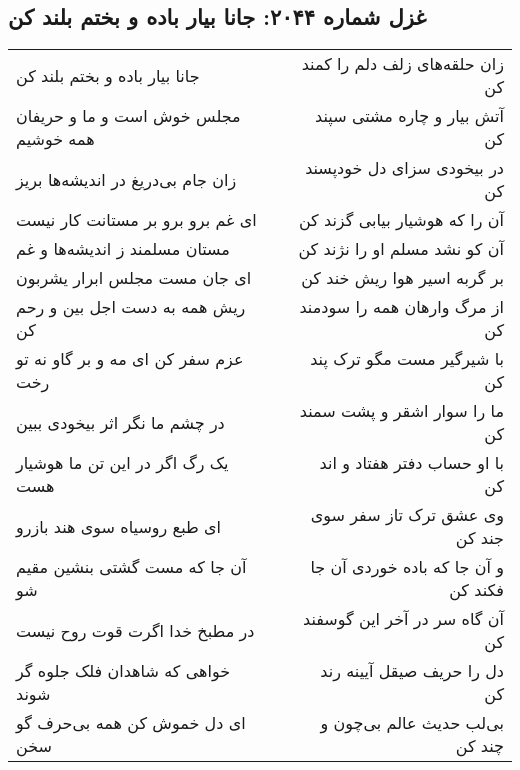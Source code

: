 \begin{center}
\section*{غزل شماره ۲۰۴۴: جانا بیار باده و بختم بلند کن}
\label{sec:2044}
\begin{longtable}{l p{0.5cm} r}
جانا بیار باده و بختم بلند کن
&&
زان حلقه‌های زلف دلم را کمند کن
\\
مجلس خوش است و ما و حریفان همه خوشیم
&&
آتش بیار و چاره مشتی سپند کن
\\
زان جام بی‌دریغ در اندیشه‌ها بریز
&&
در بیخودی سزای دل خودپسند کن
\\
ای غم برو برو بر مستانت کار نیست
&&
آن را که هوشیار بیابی گزند کن
\\
مستان مسلمند ز اندیشه‌ها و غم
&&
آن کو نشد مسلم او را نژند کن
\\
ای جان مست مجلس ابرار یشربون
&&
بر گربه اسیر هوا ریش خند کن
\\
ریش همه به دست اجل بین و رحم کن
&&
از مرگ وارهان همه را سودمند کن
\\
عزم سفر کن ای مه و بر گاو نه تو رخت
&&
با شیرگیر مست مگو ترک پند کن
\\
در چشم ما نگر اثر بیخودی ببین
&&
ما را سوار اشقر و پشت سمند کن
\\
یک رگ اگر در این تن ما هوشیار هست
&&
با او حساب دفتر هفتاد و اند کن
\\
ای طبع روسیاه سوی هند بازرو
&&
وی عشق ترک تاز سفر سوی جند کن
\\
آن جا که مست گشتی بنشین مقیم شو
&&
و آن جا که باده خوردی آن جا فکند کن
\\
در مطبخ خدا اگرت قوت روح نیست
&&
آن گاه سر در آخر این گوسفند کن
\\
خواهی که شاهدان فلک جلوه گر شوند
&&
دل را حریف صیقل آیینه رند کن
\\
ای دل خموش کن همه بی‌حرف گو سخن
&&
بی‌لب حدیث عالم بی‌چون و چند کن
\\
\end{longtable}
\end{center}
